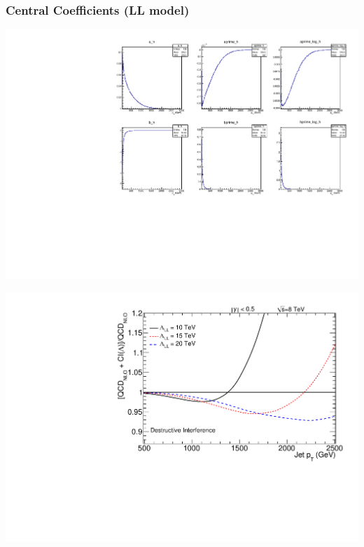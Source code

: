 \documentclass{beamer}
\begin{document}
\begin{frame}
	\frametitle{Central Coefficients (LL model)}
	\begin{*figure}
\begin{center}
 \vspace {0.05 in}
 \includegraphics [width=0.9\linewidth] {central_coeffs_LL.pdf}
 \vspace {0.05 in}
\caption{}
\end{center}
\end{*figure} 
\end{frame}

\begin{frame}
\begin{*figure}
\begin{center}
 \vspace {0.05 in}
 \includegraphics [width=0.9\linewidth] {LL_D.pdf}
 \vspace {0.05 in}
\caption{}
\end{center}
\end{*figure} 
\end{frame}
\end{document}

